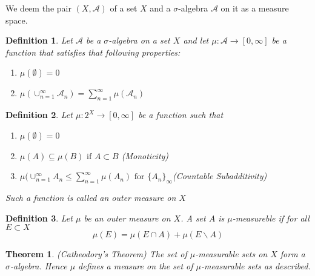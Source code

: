 \documentclass[12pt]{article}
\newtheorem{theorem}{Theorem}[section]
\newtheorem{definition}{Definition}[section]
\theoremstyle{remark}
\begin{document}
We deem the pair $(X,\mathcal{A})$ of a set $X$ and a $\sigma$-algebra $\mathcal{A}$ on it as a measure space.


\begin{definition}
	Let $\mathcal{A}$ be a $\sigma$-algebra on a set $X$ and let $\mu: \mathcal{A} \rightarrow [0,\infty]$ be a 	function that satisfies that following properties:
	\begin{enumerate}
	\item $\mu(\emptyset) = 0$
	\item $\mu(\cup_{n = 1}^{\infty} \mathcal{A}_n) = \sum_{n = 1}^{\infty} \mu(\mathcal{A}_n)$
\end{enumerate}
\end{definition} 

\begin{definition}
Let  $\mu:2^X \rightarrow [0,\infty]$ be a function such that 
\begin{enumerate}
	\item $\mu(\emptyset) = 0$
	\item $\mu(A) \subseteq \mu(B) \text{ if } A \subset B$ (Monoticity)
	\item $\mu(\cup_{n=1}^{\infty} A_n \leq \sum_{n=1}^{\infty} \mu(A_n) \text{ for } \{A_n\}_{\infty}$(Countable Subadditivity)
\end{enumerate}	

Such a function is called an outer measure on $X$
\end{definition}

\begin{definition}
Let $\mu$ be an outer measure on $X$. A set $A$ is $\mu$-measureble if for all $E \subset X$
$$ \mu(E) = \mu(E \cap A) + \mu(E\backslash A) $$
\end{definition}

\begin{theorem}(Catheodory's Theorem)
\label{cath}
The set of $\mu$-measurable sets on $X$ form a $\sigma$-algebra. Hence $\mu$ defines a measure on the set of $\mu$-measurable sets as described.
\end{theorem}
\end{document}
